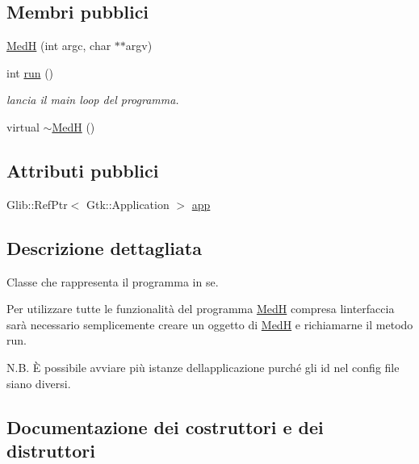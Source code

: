 \subsection*{Membri pubblici}
\begin{DoxyCompactItemize}
\item 
\mbox{\hyperlink{classmm_1_1_med_h_a60861cff31fe5bc04e0002c6dabd5a9b}{MedH}} (int argc, char $\ast$$\ast$argv)
\item 
int \mbox{\hyperlink{classmm_1_1_med_h_aa34d2244a28a72dac6028e70317eb40b}{run}} ()
\begin{DoxyCompactList}\small\item\em lancia il main loop del programma. \end{DoxyCompactList}\item 
virtual \mbox{\hyperlink{classmm_1_1_med_h_a6fe53e9376821a1aae7d5a3a32d203c3}{$\sim$\+MedH}} ()
\end{DoxyCompactItemize}
\subsection*{Attributi pubblici}
\begin{DoxyCompactItemize}
\item 
Glib\+::\+Ref\+Ptr$<$ Gtk\+::\+Application $>$ \mbox{\hyperlink{classmm_1_1_med_h_a6bbf4476e1953d62562d35cb1f9c4218}{app}}
\end{DoxyCompactItemize}


\subsection{Descrizione dettagliata}
Classe che rappresenta il programma in se. 

Per utilizzare tutte le funzionalità del programma \mbox{\hyperlink{classmm_1_1_med_h}{MedH}} compresa l\textquotesingle{}interfaccia sarà necessario semplicemente creare un oggetto di \mbox{\hyperlink{classmm_1_1_med_h}{MedH}} e richiamarne il metodo run.

N.\+B. È possibile avviare più istanze dell\textquotesingle{}applicazione purché gli id nel config file siano diversi. 

\subsection{Documentazione dei costruttori e dei distruttori}
\mbox{\label{classmm_1_1_med_h_a60861cff31fe5bc04e0002c6dabd5a9b}} 
